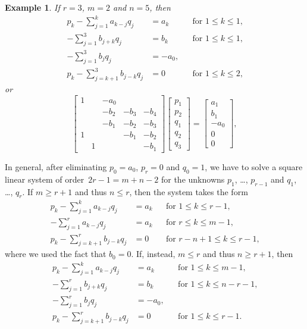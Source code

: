 \documentclass[12pt,a4paper]{article}
\newtheorem{example}{Example}
\begin{document}
\begin{example}
If $r=3$, $m=2$ and $n=5$, then
\[
\begin{aligned}
p_k-\sum_{j=1}^ka_{k-j}q_j&=a_k&&\text{for $1\le k\le 1$,}\\
-\sum_{j=1}^3 b_{j+k}q_j&=b_k&&\text{for $1\le k\le1$,}\\
-\sum_{j=1}^3 b_jq_j&=-a_0,&&\\
p_k-\sum_{j=k+1}^3b_{j-k}q_j&=0&&\text{for $1\le k\le 2$,}
\end{aligned}
\]
or
\[
\begin{bmatrix}
1& &-a_0&    &\\
 & &-b_2&-b_3&-b_4\\
 & &-b_1&-b_2&-b_3\\
1& &    &-b_1&-b_2\\
 &1&    &    &-b_1
\end{bmatrix}
\begin{bmatrix}p_1\\ p_2\\ q_1\\ q_2\\ q_3\end{bmatrix}
=\begin{bmatrix}a_1\\ b_1\\ -a_0\\ 0\\ 0\end{bmatrix},
\]

\end{example}

In general, after eliminating $p_0=a_0$, $p_r=0$ and $q_0=1$, we have to solve 
a square linear system of order~$2r-1=m+n-2$ for the unknowns $p_1$, \ldots,
$p_{r-1}$ and $q_1$, \ldots, $q_r$.  If $m\ge r+1$ and thus $n\le r$, then the
system takes the form
\[
\begin{aligned}
p_k-\sum_{j=1}^k a_{k-j}q_j&=a_k&&\text{for $1\le k\le r-1$,}\\
-\sum_{j=1}^r a_{k-j}q_j&=a_k&&\text{for $r\le k\le m-1$,}\\
p_k-\sum_{j=k+1}^r b_{j-k}q_j&=0&&\text{for $r-n+1\le k\le r-1$,}
\end{aligned}
\]
where we used the fact that $b_0=0$. If, instead, $m\le r$ and thus $n\ge r+1$, 
then
\[
\begin{aligned}
p_k-\sum_{j=1}^k a_{k-j}q_j&=a_k&&\text{for $1\le k\le m-1$,}\\
-\sum_{j=1}^r b_{j+k}q_j&=b_k&&\text{for $1\le k\le n-r-1$,}\\
-\sum_{j=1}^r b_jq_j&=-a_0,&&\\
p_k-\sum_{j=k+1}^r b_{j-k}q_j&=0&&\text{for $1\le k\le r-1$.}
\end{aligned}
\]
\end{document}
